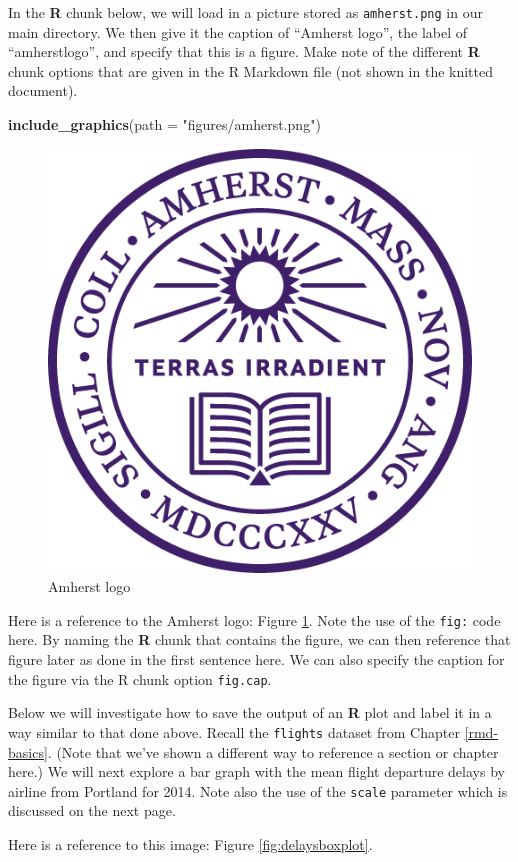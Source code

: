 \documentclass[12pt, twoside]{amherstthesis}
\newenvironment{Shaded}{\begin{snugshade}}{\end{snugshade}}
\newcommand{\CommentTok}[1]{\textcolor[rgb]{0.56,0.35,0.01}{\textit{#1}}}
\newcommand{\DataTypeTok}[1]{\textcolor[rgb]{0.13,0.29,0.53}{#1}}
\newcommand{\KeywordTok}[1]{\textcolor[rgb]{0.13,0.29,0.53}{\textbf{#1}}}
\newcommand{\NormalTok}[1]{#1}
\newcommand{\StringTok}[1]{\textcolor[rgb]{0.31,0.60,0.02}{#1}}
\begin{document}
In the \textbf{R} chunk below, we will load in a picture stored as \texttt{amherst.png} in our main directory. We then give it the caption of ``Amherst logo'', the label of ``amherstlogo'', and specify that this is a figure. Make note of the different \textbf{R} chunk options that are given in the R Markdown file (not shown in the knitted document).
\begin{Shaded}
\begin{Highlighting}[]
\KeywordTok{include_graphics}\NormalTok{(}\DataTypeTok{path =} \StringTok{"figures/amherst.png"}\NormalTok{)}
\end{Highlighting}
\end{Shaded}
\begin{figure}

{\centering \includegraphics[width=0.5\linewidth]{figures/amherst} 

}

\caption{Amherst logo}\label{fig:amherstlogo}
\end{figure}
Here is a reference to the Amherst logo: Figure \ref{fig:amherstlogo}. Note the use of the \texttt{fig:} code here. By naming the \textbf{R} chunk that contains the figure, we can then reference that figure later as done in the first sentence here. We can also specify the caption for the figure via the R chunk option \texttt{fig.cap}.

\clearpage

Below we will investigate how to save the output of an \textbf{R} plot and label it in a way similar to that done above. Recall the \texttt{flights} dataset from Chapter \ref{rmd-basics}. (Note that we've shown a different way to reference a section or chapter here.) We will next explore a bar graph with the mean flight departure delays by airline from Portland for 2014. Note also the use of the \texttt{scale} parameter which is discussed on the next page.
\begin{Shaded}
\end{Shaded}
Here is a reference to this image: Figure \ref{fig:delaysboxplot}.
\end{document}
